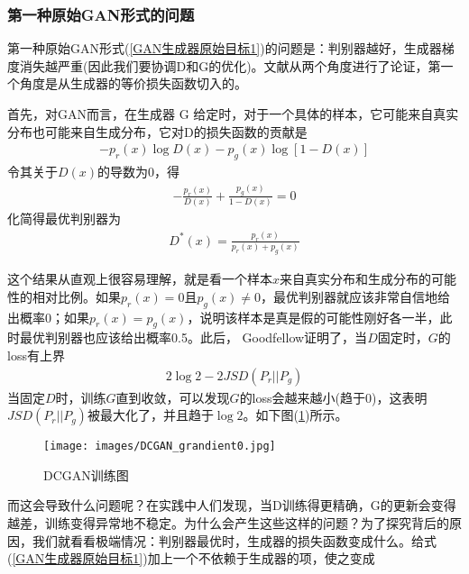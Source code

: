         \subsubsection{第一种原始GAN形式的问题}
            \par
            第一种原始GAN形式(\ref{GAN生成器原始目标1})的问题是：判别器越好，生成器梯度消失越严重(因此我们要协调D和G的优化)。文献\cite{2017.Arjovsky}从两个角度进行了论证，第一个角度是从生成器的等价损失函数切入的。
            \par
            首先，对GAN而言，在生成器 G 给定时，对于一个具体的样本，它可能来自真实分布也可能来自生成分布，它对D的损失函数的贡献是
            \begin{align*}
            -p_r(x)\log D(x) - p_g(x)\log [1-D(x)]
            \end{align*}
            令其关于$D(x)$的导数为0，得
            \begin{align*}
            -\frac{p_r(x)}{D(x)}+ \frac{p_g(x)}{1-D(x)}= 0
            \end{align*}
            化简得最优判别器为
            \begin{align}
            \label{最优判别器}
            D^*(x) = \frac{p_r(x)}{p_r(x)+p_g(x)}
            \end{align}
            \par
            这个结果从直观上很容易理解，就是看一个样本$ x $来自真实分布和生成分布的可能性的相对比例。如果$ p_r(x) = 0 $且$ p_g(x) \neq 0$，最优判别器就应该非常自信地给出概率0；如果$ p_r(x) = p_g(x)$，说明该样本是真是假的可能性刚好各一半，此时最优判别器也应该给出概率0.5。此后，
            Goodfellow证明了，当$D$固定时，$G$的loss有上界
            \begin{align*}
            2\log 2 - 2JSD(P_r||P_g)
            \end{align*}
            当固定$D$时，训练$G$直到收敛，可以发现$G$的loss会越来越小(趋于0)，这表明$JSD(P_r || P_g)$被最大化了，并且趋于$\log2$。如下图(\ref{fig:DCGAN梯度趋于0示意图})所示。
                \begin{figure}[H]
                \centering
                \texttt{[image: images/DCGAN\_grandient0.jpg]}
                \caption{DCGAN训练图}
                \label{fig:DCGAN梯度趋于0示意图}
                \end{figure}
            而这会导致什么问题呢？在实践中人们发现，当D训练得更精确，G的更新会变得越差，训练变得异常地不稳定。为什么会产生这些这样的问题？为了探究背后的原因，我们就看看极端情况：判别器最优时，生成器的损失函数变成什么。给式(\ref{GAN生成器原始目标1})加上一个不依赖于生成器的项，使之变成
